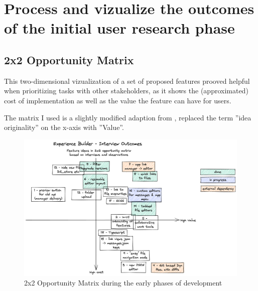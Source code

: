 
\section{Process and vizualize the outcomes of the initial user research phase}

\subsection{2x2 Opportunity Matrix}

This two-dimensional vizualization of a set of proposed features prooved helpful when prioritizing tasks with other stakeholders,
as it shows the (approximated) cost of implementation as well as the value the feature can have for users.

The matrix I used is a slightly modified adaption from \cite[p. 181]{LearnHCI:2020ys}, replaced the term ''idea originality'' on the x-axis with ''Value''.

\begin{figure}[ht]
	\centering
  \includegraphics[width=\textwidth]{pics/feature_cost_matrix.excalidraw.png}
	\caption{2x2 Opportunity Matrix during the early phases of development}
	\label{fig:opportunitymatrix}
\end{figure}
